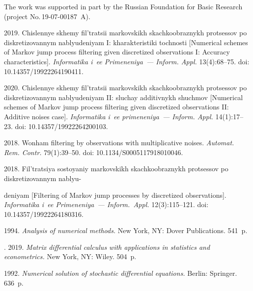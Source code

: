 \vspace*{-6pt}

\Ack
\noindent
The work was supported in part by the Russian Foundation
for Basic Research (project No.\,19-07-00187~A).


\vspace*{6pt}

 \begin{multicols}{2}

\renewcommand{\bibname}{\protect\rmfamily References}

{\small\frenchspacing
 {%
 \begin{thebibliography}{9}


 

 2019. Chislennye skhemy fil'tratsii markovskikh 
skachkoobraznykh protsessov po diskretizovannym nablyudeniyam I: 
kharakteristiki tochnosti [Numerical schemes of Markov jump process 
filtering given discretized observations I: Accuracy characteristics]. 
\textit{Informatika i~ee Primeneniya~--- Inform. Appl.} 13(4):68--75. 
doi: 10.14357/19922264190411.

 2020. Chislennye skhemy fil'tratsii markovskikh 
skachkoobraznykh protsessov po diskretizovannym nablyudeniyam II: sluchay 
additivnykh shuchmov [Numerical schemes of Markov jump process filtering 
given discretized observations II: Additive noises case]. 
\textit{Informatika i~ee primeneniya~--- Inform. Appl.} 14(1):17--23. 
doi: 10.14357/19922264200103.

 2018. 
Wonham filtering by observations with multiplicative noises. 
\textit{Automat. Rem. Contr.} 79(1):39--50. 
doi: 10.1134/S0005117918010046.

 2018. Fil'tratsiya sostoyaniy markovskikh 
skachkoobraznykh protsessov po diskretizovannym nablyu-\linebreak\vspace*{-12pt}

\pagebreak

\noindent
deniyam [Filtering 
of Markov jump processes by discretized observations]. 
\textit{Informatika i~ee Primeneniya~--- Inform.~Appl.} 12(3):115--121. 
doi: 10.14357/19922264180316.

 1994.
\textit{Analysis of numerical methods.} New York, NY: Dover Publications. 
541~p.



. 2019.
\textit{Matrix differential calculus with applications in statistics and 
econometrics.} 
New York, NY: Wiley. 504~p.

 1992. \textit{Numerical solution of 
stochastic
differential equations.} Berlin: Springer. 636~p.


\end{thebibliography}

 }
 }

\end{multicols}
